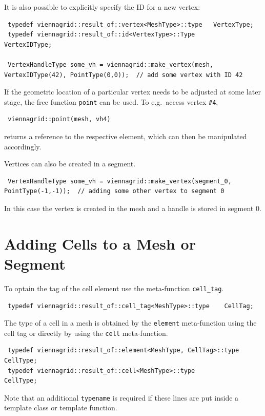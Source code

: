 It is also possible to explicitly specify the ID for a new vertex:
\begin{lstlisting}
 typedef viennagrid::result_of::vertex<MeshType>::type   VertexType;
 typedef viennagrid::result_of::id<VertexType>::Type       VertexIDType;
 
 VertexHandleType some_vh = viennagrid::make_vertex(mesh, VertexIDType(42), PointType(0,0));  // add some vertex with ID 42
\end{lstlisting}

If the geometric location of a particular vertex needs to be adjusted at some later stage, the free function \lstinline|point| can be used. To e.g.~access vertex \lstinline|#4|,
\begin{lstlisting}
 viennagrid::point(mesh, vh4)
\end{lstlisting}
returns a reference to the respective element, which can then be manipulated accordingly.

Vertices can also be created in a segment.
\begin{lstlisting}
 VertexHandleType some_vh = viennagrid::make_vertex(segment_0, PointType(-1,-1));  // adding some other vertex to segment 0
\end{lstlisting}
In this case the vertex is created in the mesh and a handle is stored in segment 0.


\section{Adding Cells to a Mesh or Segment}
To optain the tag of the cell element use the meta-function \lstinline|cell_tag|.
\begin{lstlisting}
 typedef viennagrid::result_of::cell_tag<MeshType>::type    CellTag;
\end{lstlisting}

The type of a cell in a mesh is obtained by the \lstinline|element| meta-function using the cell tag or directly by using the \lstinline|cell| meta-function.
\begin{lstlisting}
 typedef viennagrid::result_of::element<MeshType, CellTag>::type    CellType;
 typedef viennagrid::result_of::cell<MeshType>::type                CellType;
\end{lstlisting}
Note that an additional \lstinline|typename| is required if these lines are put inside a template class or template function.

